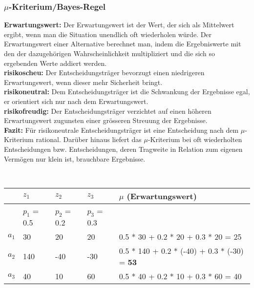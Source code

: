 \subsubsection{$\mu$-Kriterium/Bayes-Regel}
\textbf{Erwartungswert:} Der Erwartungswert ist der Wert, der sich als Mittelwert ergibt, wenn man die Situation unendlich oft wiederholen würde. Der Erwartungswert einer Alternative berechnet man, indem die Ergebniswerte mit den der dazugehörigen Wahrscheinlichkeit multipliziert und die sich so ergebenden Werte addiert werden. \\
\textbf{risikoscheu:} Der Entscheidungsträger bevorzugt einen niedrigeren Erwartungswert, wenn dieser mehr Sicherheit bringt.\\
\textbf{risikoneutral:} Dem Entscheidungsträger ist die Schwankung der Ergebnisse egal, er orientiert sich nur nach dem Erwartungswert.\\
\textbf{risikofreudig:} Der Entscheidungsträger verzichtet auf einen höheren Erwartungswert zugunsten einer grösseren Streuung der Ergebnisse.\\
\textbf{Fazit:} Für risikoneutrale Entscheidungsträger ist eine Entscheidung nach dem $\mu$-Kriterium rational. Darüber hinaus liefert das $\mu$-Kriterium bei oft wiederholten Entscheidungen bzw. Entscheidungen, deren Tragweite in Relation zum eigenen Vermögen nur klein ist, brauchbare Ergebnisse.
\begin{example} \\
	\begin{tabular}{|l|l|l|l|l|}
		\hline
		& $z_1$ & $z_2$ & $z_3$ & $\mu$ (Erwartungswert) \\ \hline
		& $p_1$ = 0.5 & $p_2$ = 0.2 & $p_3$ = 0.3 & \\ \hline
		$a_1$ & 30 & 20 & 20 & 0.5 * 30 + 0.2 * 20  + 0.3 * 20 = 25 \\ \hline
		$a_2$ & 140 & -40 & -30 & 0.5 * 140 + 0.2 * (-40) + 0.3 * (-30) = \textbf{53} \\ \hline
		$a_3$ & 40 & 10 & 60 & 0.5 * 40 + 0.2 * 10 + 0.3 * 60 = 40 \\ \hline		
	\end{tabular}
\end{example}

